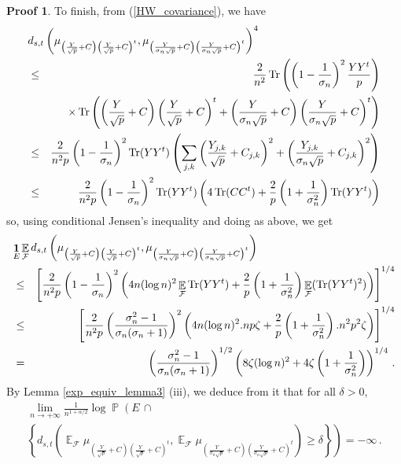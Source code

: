 \documentclass[11pt,a4paper]{article}
\DeclareMathOperator{\E}{\mathbb{E}}
\DeclareMathOperator{\PR}{\mathbb{P}}
\DeclareMathOperator{\FF}{\mathcal{F}}
\DeclareMathOperator{\1}{\mathbf{1}}
\DeclareMathOperator{\Tr}{\mathrm{Tr}}
\theoremstyle{definition}
\newtheorem*{Proof}{Proof}
\begin{document}
\begin{Proof}
To finish, from (\ref{HW_covariance}), we have
\begin{eqnarray*}
\lefteqn{  d_{s,t} \left( \mu_{\left( \frac{Y}{\sqrt{p}} + C \right) \left( \frac{Y}{\sqrt{p}} + C \right)^t} ,  \mu_{\left( \frac{Y}{\sigma_n \sqrt{p}} + C \right) \left( \frac{Y}{\sigma_n \sqrt{p}} + C \right)^t} \right)^4  } \\
& \le & \frac{2}{n^2} \Tr \left( \left( 1-\frac{1}{\sigma_n} \right)^2 \frac{YY^t}{p} \right) \\
& & \quad \times \Tr \left( \left( \frac{Y}{\sqrt{p}} + C \right) \left( \frac{Y}{\sqrt{p}} + C \right)^t + \left( \frac{Y}{\sigma_n \sqrt{p}} + C \right) \left( \frac{Y}{\sigma_n \sqrt{p}} + C \right)^t \right) \\
& \le & \frac{2}{n^2p} \left( 1-\frac{1}{\sigma_n} \right)^2 \Tr(YY^t) \left( \sum_{j,k} \left( \frac{Y_{j,k}}{\sqrt{p}} + C_{j,k} \right)^2 + \left( \frac{Y_{j,k}}{\sigma_n \sqrt{p}} + C_{j,k} \right)^2 \right) \\
& \le & \frac{2}{n^2p} \left( 1-\frac{1}{\sigma_n} \right)^2 \Tr(YY^t) \left( 4\Tr(CC^t) + \frac2p \left( 1+\frac{1}{\sigma_n^2} \right) \Tr(YY^t) \right)
\end{eqnarray*}
so, using conditional Jensen's inequality and doing as above, we get
\begin{eqnarray*}
\lefteqn{  \1_E \E_{\FF} d_{s,t} \left( \mu_{\left( \frac{Y}{\sqrt{p}} + C \right) \left( \frac{Y}{\sqrt{p}} + C \right)^t} , \mu_{\left( \frac{Y}{\sigma_n \sqrt{p}} + C \right) \left( \frac{Y}{\sigma_n \sqrt{p}} + C \right)^t} \right)  } \\
& \le & \left[ \frac{2}{n^2p} \left( 1-\frac{1}{\sigma_n} \right)^2 \left( 4n(\log n)^2 \E_{\FF} \Tr(YY^t) + \frac2p \left( 1+\frac{1}{\sigma_n^2} \right) \E_{\FF}(\Tr(YY^t)^2) \right) \right]^{1/4} \\
& \le & \left[ \frac{2}{n^2p} \left( \frac{\sigma_n^2-1}{\sigma_n(\sigma_n+1)} \right)^2 \left( 4n(\log n)^2.np\zeta + \frac2p \left( 1+\frac{1}{\sigma_n^2} \right).n^2p^2\zeta \right) \right]^{1/4} \\
& = & \left( \frac{\sigma_n^2-1}{\sigma_n(\sigma_n+1)} \right)^{1/2} \left( 8\zeta (\log n)^2 + 4\zeta \left( 1+\frac{1}{\sigma_n^2} \right) \right)^{1/4} \, .
\end{eqnarray*}
By Lemma \ref{exp_equiv_lemma3} (iii), we deduce from it that for all $\delta>0$,
\begin{multline} \label{exp_equiv_eq8}
\lim_{n \to +\infty} \frac{1}{n^{1+\alpha/2}} \log \PR \left( E \, \cap \, \right. \\
\left. \left\{ d_{s,t} \left( \E_{\FF} \mu_{\left( \frac{Y}{\sqrt{p}} + C \right) \left( \frac{Y}{\sqrt{p}} + C \right)^t} , \E_{\FF} \mu_{\left( \frac{Y}{\sigma_n \sqrt{p}} + C \right) \left( \frac{Y}{\sigma_n \sqrt{p}} + C \right)^t} \right) \ge \delta \right\} \right) = -\infty \, .
\end{multline}


\end{Proof}
\end{document}
